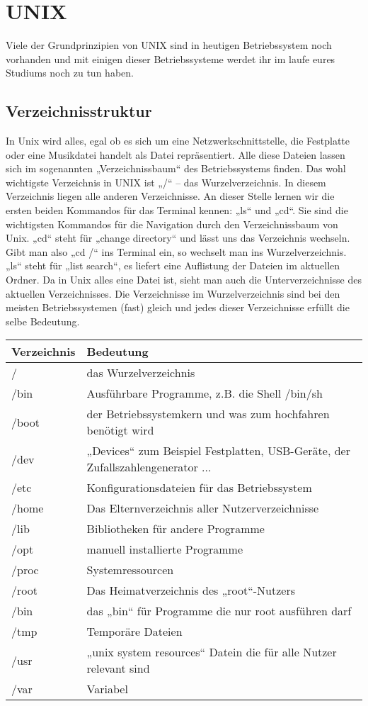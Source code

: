 \chapter{UNIX}

Viele der Grundprinzipien von UNIX sind in heutigen Betriebssystem noch vorhanden und mit einigen dieser Betriebssysteme werdet ihr im laufe eures Studiums noch zu tun haben.

\section{Verzeichnisstruktur}
In Unix wird alles, egal ob es sich um eine Netzwerkschnittstelle, die Festplatte oder eine Musikdatei handelt als Datei repräsentiert. Alle diese Dateien lassen sich im sogenannten „Verzeichnissbaum“ des Betriebssystems finden. Das wohl wichtigste Verzeichnis in UNIX ist „/“ – das Wurzelverzeichnis. In diesem Verzeichnis liegen alle anderen Verzeichnisse.
An dieser Stelle lernen wir die ersten beiden Kommandos für das Terminal kennen: „ls“ und „cd“. Sie sind die wichtigsten Kommandos für die Navigation durch den Verzeichnissbaum von Unix. „cd“ steht für „change directory“ und lässt uns das Verzeichnis wechseln. Gibt man also „cd /“ ins Terminal ein, so wechselt man ins Wurzelverzeichnis. „ls“ steht für „list search“, es liefert eine Auflistung der Dateien im aktuellen Ordner.
Da in Unix alles eine Datei ist, sieht man auch die Unterverzeichnisse des aktuellen Verzeichnisses.
Die Verzeichnisse im Wurzelverzeichnis sind bei den meisten Betriebssystemen (fast) gleich und jedes dieser Verzeichnisse erfüllt die selbe Bedeutung.

\begin{table}
\centering
\begin{tabular}{l|l}
Verzeichnis & Bedeutung \\ \hline
/ & das Wurzelverzeichnis \\
/bin & Ausführbare Programme, z.B. die Shell /bin/sh \\
/boot & der Betriebssystemkern und was zum hochfahren benötigt wird \\
/dev & „Devices“ zum Beispiel Festplatten, USB-Geräte, der Zufallszahlengenerator ...\\
/etc & Konfigurationsdateien für das Betriebssystem \\
/home & Das Elternverzeichnis aller Nutzerverzeichnisse \\
/lib & Bibliotheken für andere Programme \\
/opt & manuell installierte Programme \\
/proc & Systemressourcen \\
/root & Das Heimatverzeichnis des „root“-Nutzers \\
/bin & das „bin“ für Programme die nur root ausführen darf \\
/tmp & Temporäre Dateien \\
/usr & „unix system resources“ Datein die für alle Nutzer relevant sind \\
/var & Variabel
\end{tabular}
\label{UNIX-Verzeichnisse}
\end{table}

